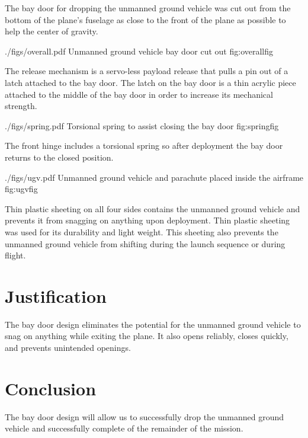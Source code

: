 \documentclass[]{auvsi_doc}
\begin{document}
The bay door for dropping the unmanned ground vehicle was cut out from the bottom of the plane's fuselage as close to the front of the plane as possible to help the center of gravity.

\AUVSIFigure
{./figs/overall.pdf}
{\textwidth}
{Unmanned ground vehicle bay door cut out}
{fig:overallfig}

The release mechanism is a servo-less payload release that pulls a pin out of a latch attached to the bay door. The latch on the bay door is a thin acrylic piece attached to the middle of the bay door in order to increase its mechanical strength.

\AUVSIFigure
{./figs/spring.pdf}
{\textwidth}
{Torsional spring to assist closing the bay door}
{fig:springfig}

The front hinge includes a torsional spring so after deployment the bay door returns to the closed position.

\AUVSIFigure
{./figs/ugv.pdf}
{\textwidth}
{Unmanned ground vehicle and parachute placed inside the airframe}
{fig:ugvfig}

Thin plastic sheeting on all four sides contains the unmanned ground vehicle and prevents it from snagging on anything upon deployment. Thin plastic sheeting was used for its durability and light weight. This sheeting also prevents the unmanned ground vehicle from shifting during the launch sequence or during flight.

\section{Justification}

The bay door design eliminates the potential for the unmanned ground vehicle to snag on anything while exiting the plane. It also opens reliably, closes quickly, and prevents unintended openings.

\section{Conclusion}

The bay door design will allow us to successfully drop the unmanned ground vehicle and successfully complete of the remainder of the mission.
\end{document}
